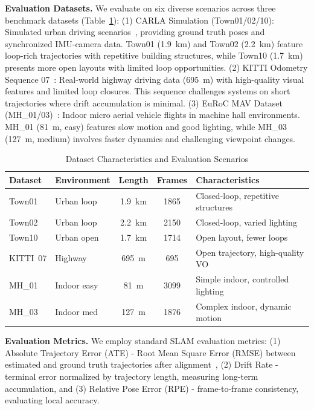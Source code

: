\textbf{Evaluation Datasets.} We evaluate on six diverse scenarios across three benchmark datasets (Table~\ref{tab:datasets}): (1) CARLA Simulation (Town01/02/10): Simulated urban driving scenarios~\cite{dosovitskiy2017carla}, providing ground truth poses and synchronized IMU-camera data. Town01 (1.9~km) and Town02 (2.2~km) feature loop-rich trajectories with repetitive building structures, while Town10 (1.7~km) presents more open layouts with limited loop opportunities. (2) KITTI Odometry Sequence 07~\cite{geiger2012kitti}: Real-world highway driving data (695~m) with high-quality visual features and limited loop closures. This sequence challenges systems on short trajectories where drift accumulation is minimal. (3) EuRoC MAV Dataset (MH\_01/03)~\cite{burri2016euroc}: Indoor micro aerial vehicle flights in machine hall environments. MH\_01 (81~m, easy) features slow motion and good lighting, while MH\_03 (127~m, medium) involves faster dynamics and challenging viewpoint changes.

\begin{table}[!t]
    \centering
    \setlength{\tabcolsep}{2.8pt} %
    \footnotesize
    \caption{Dataset Characteristics and Evaluation Scenarios}
    \label{tab:datasets}
    \begin{tabular}{@{}llccl@{}}
        \toprule
        Dataset  & Environment & Length & Frames & Characteristics                    \\
        \midrule
        Town01   & Urban loop  & 1.9~km & 1865   & Closed-loop, repetitive structures \\
        Town02   & Urban loop  & 2.2~km & 2150   & Closed-loop, varied lighting       \\
        Town10   & Urban open  & 1.7~km & 1714   & Open layout, fewer loops           \\
        KITTI~07 & Highway     & 695~m  & 695    & Open trajectory, high-quality VO   \\
        MH\_01   & Indoor easy & 81~m   & 3099   & Simple indoor, controlled lighting \\
        MH\_03   & Indoor med  & 127~m  & 1876   & Complex indoor, dynamic motion     \\
        \bottomrule
    \end{tabular}
\end{table}

\textbf{Evaluation Metrics.} We employ standard SLAM evaluation metrics: (1) Absolute Trajectory Error (ATE) - Root Mean Square Error (RMSE) between estimated and ground truth trajectories after alignment~\cite{sturm2012benchmark}, (2) Drift Rate - terminal error normalized by trajectory length, measuring long-term accumulation, and (3) Relative Pose Error (RPE) - frame-to-frame consistency, evaluating local accuracy.


